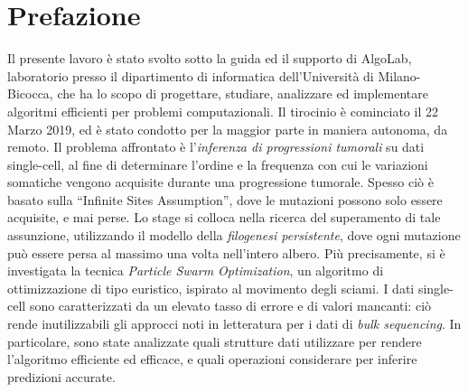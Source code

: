 \null{}
\chapter*{\centering Prefazione}

Il presente lavoro è stato svolto sotto la guida ed il supporto di AlgoLab, laboratorio presso il dipartimento di informatica dell'Università di Milano-Bicocca, che ha lo scopo di progettare, studiare, analizzare ed implementare algoritmi efficienti per problemi computazionali. Il tirocinio è cominciato il 22 Marzo 2019, ed è stato condotto per la maggior parte in maniera autonoma, da remoto.
Il problema affrontato è l'\textit{inferenza di progressioni tumorali} su dati single-cell, al fine di determinare l'ordine e la frequenza con cui le variazioni somatiche vengono acquisite durante una progressione tumorale. Spesso ciò è basato sulla “Infinite Sites Assumption”, dove le mutazioni possono solo essere acquisite, e mai perse. Lo stage si colloca nella ricerca del superamento di tale assunzione, utilizzando il modello della \textit{filogenesi persistente}, dove ogni mutazione può essere persa al massimo una volta nell'intero albero. Più precisamente, si è investigata la tecnica \textit{Particle Swarm Optimization}, un algoritmo di ottimizzazione di tipo euristico, ispirato al movimento degli sciami. I dati single-cell sono caratterizzati da un elevato tasso di errore e di valori mancanti: ciò rende inutilizzabili gli approcci noti in letteratura per i dati di \textit{bulk sequencing}. In particolare, sono state analizzate quali strutture dati utilizzare per rendere l'algoritmo efficiente ed efficace, e quali operazioni considerare per inferire predizioni accurate.

 \null
